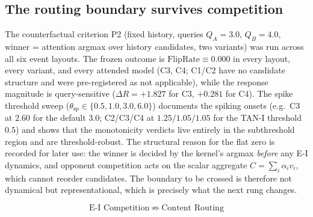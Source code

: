 \subsection{The routing boundary survives competition}
\label{sec:flip41}

The counterfactual criterion P2 (fixed history, queries $Q_A=3.0$,
$Q_B=4.0$, winner = attention argmax over history candidates, two
variants) was run across all six event layouts. The frozen outcome is
$\mathrm{FlipRate}\equiv0.000$ in every layout, every variant, and every
attended model (C3, C4; C1/C2 have no candidate structure and were
pre-registered as not applicable), while the response magnitude is
query-sensitive ($\Delta R=+1.827$ for C3, $+0.281$ for C4). The spike
threshold sweep ($\theta_{\mathrm{sp}}\in\{0.5,1.0,3.0,6.0\}$) documents
the spiking onsets (e.g.\ C3 at $2.60$ for the default $3.0$; C2/C3/C4 at
$1.25/1.05/1.05$ for the TAN-I threshold $0.5$) and shows that the
monotonicity verdicts live entirely in the subthreshold region and are
threshold-robust. The structural reason for the flat zero is recorded for
later use: the winner is decided by the kernel's argmax \emph{before} any
E-I dynamics, and opponent competition acts on the scalar aggregate
$C=\sum_i\alpha_i v_i$, which cannot reorder candidates. The boundary to
be crossed is therefore not dynamical but representational, which is
precisely what the next rung changes.

\[
\boxed{\ \text{E-I Competition}\ \not\Rightarrow\ \text{Content Routing}\ }
\]
